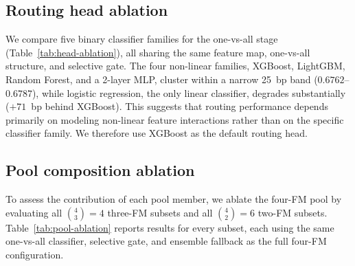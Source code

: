 \documentclass{article}
\theoremstyle{plain}
\theoremstyle{definition}
\theoremstyle{remark}
\begin{document}
\subsection{Routing head ablation}
\label{sec:head-ablation}

We compare five binary classifier families for the one-vs-all stage (Table~\ref{tab:head-ablation}), all sharing the same feature map, one-vs-all structure, and selective gate. The four non-linear families, XGBoost, LightGBM, Random Forest, and a 2-layer MLP, cluster within a narrow 25~bp band ($0.6762$--$0.6787$), while logistic regression, the only linear classifier, degrades substantially ($+71$~bp behind XGBoost). This suggests that routing performance depends primarily on modeling non-linear feature interactions rather than on the specific classifier family. We therefore use XGBoost as the default routing head.


\subsection{Pool composition ablation}
\label{sec:pool-ablation}

To assess the contribution of each pool member, we ablate the four-FM pool by evaluating all $\binom{4}{3}{=}4$ three-FM subsets and all $\binom{4}{2}{=}6$ two-FM subsets. Table~\ref{tab:pool-ablation} reports results for every subset, each using the same one-vs-all classifier, selective gate, and ensemble fallback as the full four-FM configuration.
\end{document}
